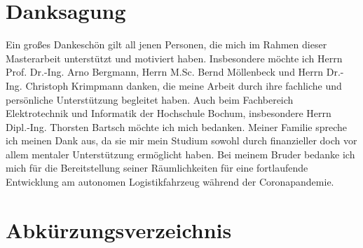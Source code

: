 \documentclass[12pt,a4paper,oneside,numbers=noenddot,headsepline,captions=tableheading,toc=bibliography,openany,tikz,margin=5mm]{scrbook}
\begin{document}
	
	\chapter*{\textbf{Danksagung}}
	
	
	Ein großes Dankeschön gilt all jenen Personen, die mich im Rahmen dieser Masterarbeit
	unterstützt und motiviert haben. Insbesondere möchte ich Herrn Prof. Dr.-Ing. Arno Bergmann, Herrn M.Sc. Bernd Möllenbeck und Herrn Dr.-Ing. Christoph Krimpmann danken, die meine Arbeit durch ihre fachliche und persönliche Unterstützung begleitet haben. Auch beim Fachbereich Elektrotechnik und Informatik der Hochschule
	Bochum, insbesondere Herrn Dipl.-Ing. Thorsten Bartsch möchte ich mich bedanken. Meiner Familie spreche ich meinen Dank aus, da sie mir mein Studium sowohl durch finanzieller doch vor allem mentaler Unterstützung ermöglicht haben. Bei meinem Bruder bedanke ich mich für die Bereitstellung seiner Räumlichkeiten für eine fortlaufende Entwicklung am autonomen Logistikfahrzeug während der Coronapandemie.  
	
	
	\tableofcontents
	\cleardoublepage
	
	
	
	\chapter*{Abkürzungsverzeichnis}
	\begin{acronym}[CONSENS]%

			
	\end{acronym}
	\cleardoublepage
	\pagestyle{plain}
	
\end{document}
